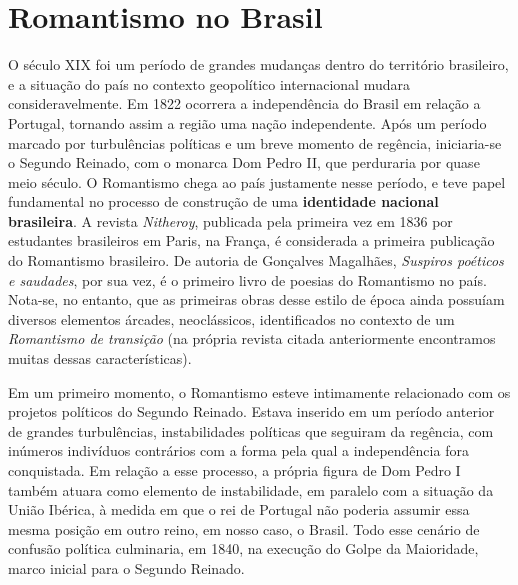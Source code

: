 
\chapter{Romantismo no Brasil}

O século XIX foi um período de grandes mudanças dentro do território brasileiro, e a situação do país no contexto geopolítico internacional mudara consideravelmente. Em 1822 ocorrera a independência do Brasil em relação a Portugal, tornando assim a região uma nação independente. Após um período marcado por turbulências políticas e um breve momento de regência, iniciaria-se o Segundo Reinado, com o monarca Dom Pedro II, que perduraria por quase meio século. O Romantismo chega ao país justamente nesse período, e teve papel fundamental no processo de construção de uma \textbf{identidade nacional brasileira}. A revista \textit{Nitheroy}, publicada pela primeira vez em 1836 por estudantes brasileiros em Paris, na França, é considerada a primeira publicação do Romantismo brasileiro. De autoria de Gonçalves Magalhães, \textit{Suspiros poéticos e saudades}, por sua vez, é o primeiro livro de poesias do Romantismo no país. Nota-se, no entanto, que as primeiras obras desse estilo de época ainda possuíam diversos elementos árcades, neoclássicos, identificados no contexto de um \textit{Romantismo de transição} (na própria revista citada anteriormente encontramos muitas dessas características).

Em um primeiro momento, o Romantismo esteve intimamente relacionado com os projetos políticos do Segundo Reinado. Estava inserido em um período anterior de grandes turbulências, instabilidades políticas que seguiram da regência, com inúmeros indivíduos contrários com a forma pela qual a independência fora conquistada. Em relação a esse processo, a própria figura de Dom Pedro I também atuara como elemento de instabilidade, em paralelo com a situação da União Ibérica, à medida em que o rei de Portugal não poderia assumir essa mesma posição em outro reino, em nosso caso, o Brasil. Todo esse cenário de confusão política culminaria, em 1840, na execução do Golpe da Maioridade, marco inicial para o Segundo Reinado.

